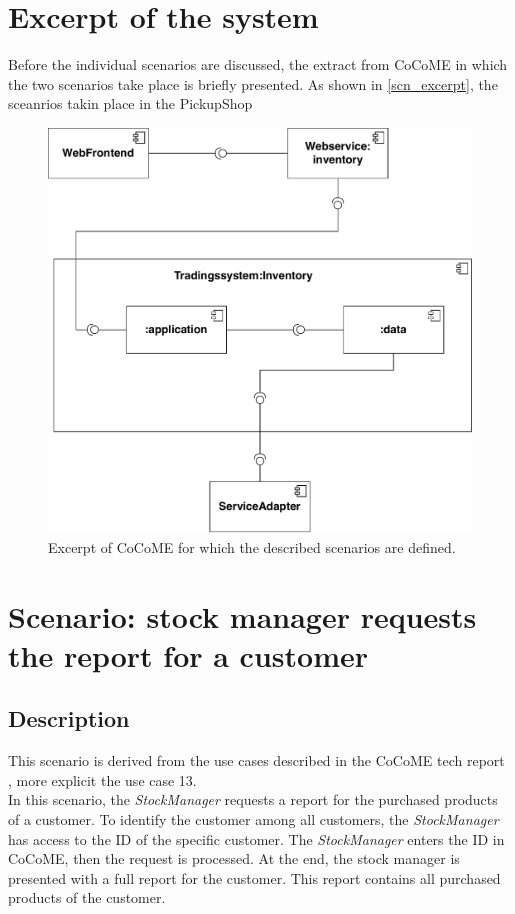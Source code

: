 \section{Excerpt of the system}
Before the individual scenarios are discussed, the extract from CoCoME in which the two scenarios take place is briefly presented. As shown in \autoref{scn_excerpt}, the sceanrios takin place in the PickupShop 
\begin{figure}
\includegraphics[scale=0.8]{logos/ExcerptUC13.pdf}
\caption{Excerpt of CoCoME for which the described scenarios are defined.}
\label{scn_excerpt}
\end{figure}
\section{Scenario: stock manager requests the report for a customer}
\label{descripScn_casestudy_scn1} 
\subsection{Description}
This scenario is derived from the use cases described in the CoCoME tech report \cite{CoCoMETechReport}, more explicit the use case 13. \\
In this scenario, the \textit{StockManager} requests a report for the purchased products of a customer. To identify the customer among all customers, the \textit{StockManager} has access to the ID of the specific customer. The \textit{StockManager} enters the ID in CoCoME, then the request is processed. At the end, the stock manager is presented with a full report for the customer. This report contains all purchased products of the customer.\\

